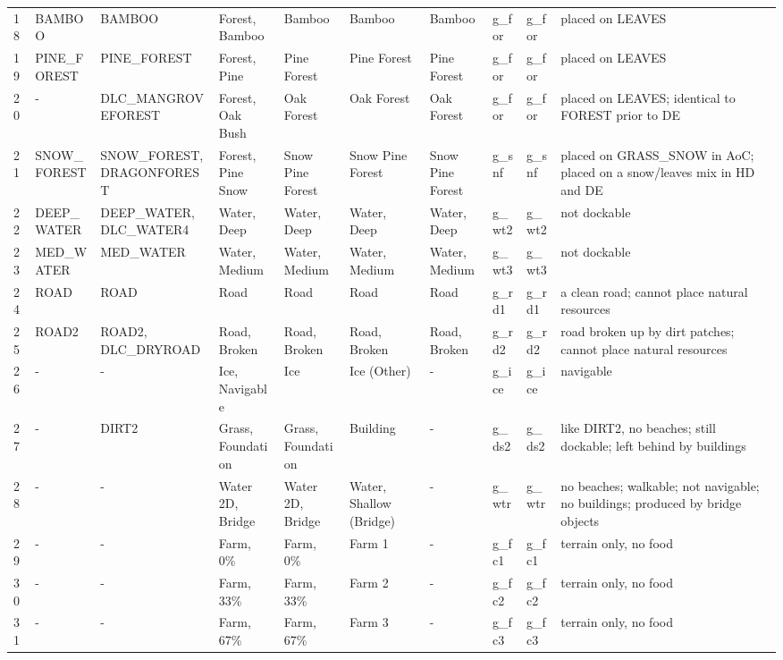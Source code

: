 \begin{appendices}
\begin{landscape}
\begin{longtable}{@{}p{5mm}|p{25mm}p{23mm}|p{14mm}p{14mm}p{14mm}p{14mm}|p{10mm}p{15mm}|p{45mm}@{}}
            18	& BAMBOO	& BAMBOO	& Forest, Bamboo	& Bamboo	& Bamboo	& Bamboo	& g\_for	& g\_for		& placed on LEAVES \\
            19	& PINE\_FOREST	& PINE\_FOREST	& Forest, Pine	& Pine Forest	& Pine Forest	& Pine Forest	& g\_for	& g\_for		& placed on LEAVES \\
            20	& -	& DLC\_MANGROVEFOREST	& Forest, Oak Bush	& Oak Forest	& Oak Forest	& Oak Forest	& g\_for	& g\_for		& placed on LEAVES; identical to FOREST prior to DE \\
            21	& SNOW\_FOREST	& SNOW\_FOREST, DRAGONFOREST	& Forest, Pine Snow	& Snow Pine Forest	& Snow Pine Forest	& Snow Pine Forest	& g\_snf	& g\_snf		& placed on GRASS\_SNOW in AoC; placed on a snow/leaves mix in HD and DE \\
            22	& DEEP\_WATER	& DEEP\_WATER, DLC\_WATER4	& Water, Deep	& Water, Deep	& Water, Deep	& Water, Deep	& g\_wt2	& g\_wt2		& not dockable \\
            23	& MED\_WATER	& MED\_WATER	& Water, Medium	& Water, Medium	& Water, Medium	& Water, Medium	& g\_wt3	& g\_wt3		& not dockable \\
            24	& ROAD	& ROAD	& Road	& Road	& Road	& Road	& g\_rd1	& g\_rd1		& a clean road; cannot place natural resources \\
            25	& ROAD2	& ROAD2, DLC\_DRYROAD	& Road, Broken	& Road, Broken	& Road, Broken	& Road, Broken	& g\_rd2	& g\_rd2		& road broken up by dirt patches; cannot place natural resources \\
            26	& -	& -	& Ice, Navigable	& Ice	& Ice (Other)	& -	& g\_ice	& g\_ice		& navigable \\
            27	& -	& DIRT2	& Grass, Foundation	& Grass, Foundation	& Building	& -	& g\_ds2	& g\_ds2		& like DIRT2, no beaches; still dockable; left behind by buildings \\
            28	& -	& -	& Water 2D, Bridge	& Water 2D, Bridge	& Water, Shallow (Bridge)	& -	& g\_wtr	& g\_wtr		& no beaches; walkable; not navigable; no buildings; produced by bridge objects \\
            29	& -	& -	& Farm, 0\%	& Farm, 0\%	& Farm 1	& -	& g\_fc1	& g\_fc1		& terrain only, no food \\
            30	& -	& -	& Farm, 33\%	& Farm, 33\%	& Farm 2	& -	& g\_fc2	& g\_fc2		& terrain only, no food \\
            31	& -	& -	& Farm, 67\%	& Farm, 67\%	& Farm 3	& -	& g\_fc3	& g\_fc3		& terrain only, no food \\

\end{longtable}
\end{landscape}
\end{appendices}
